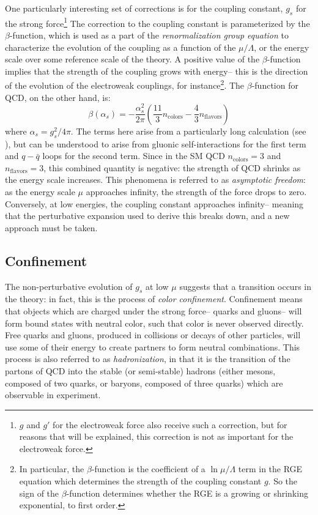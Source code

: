 One particularly interesting set of corrections is for the coupling constant, $g_s$ for the strong force\footnote{$g$ and $g'$ for the electroweak force also receive such a correction, but for reasons that will be explained, this correction is not as important for the electroweak force.} The correction to the coupling constant is parameterized by the $\beta$-function, which is used as a part of the \textit{renormalization group equation} to characterize the evolution of the coupling as a function of the $\mu/\Lambda$, or the energy scale over some reference scale of the theory. A positive value of the $\beta$-function implies that the strength of the coupling grows with energy-- this is the direction of the evolution of the electroweak couplings, for instance\footnote{In particular, the $\beta$-function is the coefficient of a $\ln{\mu/\Lambda}$ term in the RGE equation which determines the strength of the coupling constant $g$. So the sign of the $\beta$-function determines whether the RGE is a growing or shrinking exponential, to first order.}. The $\beta$-function for QCD, on the other hand, is:
%
\begin{equation}
\beta(\alpha_s) = - \frac{\alpha_s^2}{2\pi} \left(\frac{11}{3} n_\mathrm{colors} - \frac{4}{3}n_\mathrm{flavors}\right)
\end{equation} 
%
where $\alpha_s = g_s^2 / 4\pi$. The terms here arise from a particularly long calculation (see \cite{schwartz}), but can be understood to arise from gluonic self-interactions for the first term and $q-\bar{q}$ loops for the second term. Since in the SM QCD $n_\mathrm{colors} = 3$ and $n_\mathrm{flavors} = 3$, this combined quantity is negative: the strength of QCD shrinks as the energy scale increases. This phenomena is referred to as \textit{asymptotic freedom}: as the energy scale $\mu$ approaches infinity, the strength of the force drops to zero. Conversely, at low energies, the coupling constant approaches infinity-- meaning that the perturbative expansion used to derive this breaks down, and a new approach must be taken. 

\subsection{Confinement}
\label{chapter:sm:qcd:confinement}

The non-perturbative evolution of $g_s$ at low $\mu$ suggests that a transition occurs in the theory: in fact, this is the process of \textit{color confinement}. Confinement means that objects which are charged under the strong force-- quarks and gluons-- will form bound states with neutral color, such that color is never observed directly. Free quarks and gluons, produced in collisions or decays of other particles, will use some of their energy to create partners to form neutral combinations. This process is also referred to as \textit{hadronization}, in that it is the transition of the partons of QCD into the stable (or semi-stable) hadrons (either mesons, composed of two quarks, or baryons, composed of three quarks) which are observable in experiment. 

